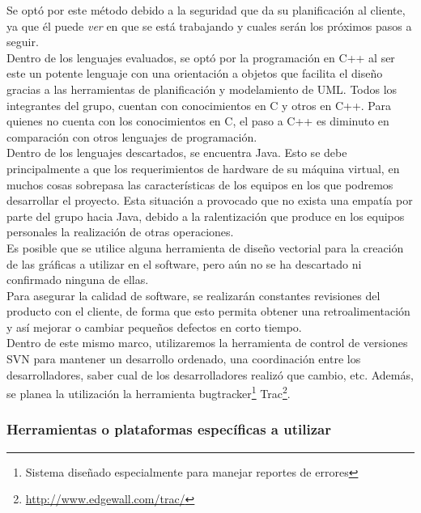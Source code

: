 \documentclass[letterpaper,spanish,10pt]{article}
\begin{document}
Se opt\'o por este m\'etodo debido a la seguridad que da su planificaci\'on al cliente, ya que \'el puede \textit{ver} en que se est\'a trabajando y cuales ser\'an los pr\'oximos pasos a seguir.\\

Dentro de los lenguajes evaluados, se opt\'o por la programaci\'on en C++ al ser este un potente lenguaje con una orientaci\'on a objetos que facilita el dise\~no gracias a las herramientas de planificaci\'on y modelamiento de UML. Todos los integrantes del grupo, cuentan con conocimientos en C y otros en C++. Para quienes no cuenta con los conocimientos en C, el paso a C++ es diminuto en comparaci\'on con otros lenguajes de programaci\'on.\\

Dentro de los lenguajes descartados, se encuentra Java. Esto se debe principalmente a que los requerimientos de hardware de su m\'aquina virtual, en muchos cosas sobrepasa las caracter\'isticas de los equipos en los que podremos desarrollar el proyecto. Esta situaci\'on a provocado que no exista una empat\'ia por parte del grupo hacia Java, debido a la ralentizaci\'on que produce en los equipos personales la realizaci\'on de otras operaciones.\\

Es posible que se utilice alguna herramienta de dise\~no vectorial para la creaci\'on de las gr\'aficas a utilizar en el software, pero a\'un no se ha descartado ni confirmado ninguna de ellas.\\

Para asegurar la calidad de software, se realizar\'an constantes revisiones del producto con el cliente, de forma que esto permita obtener una retroalimentaci\'on y as\'i mejorar o cambiar peque\~nos defectos en corto tiempo.\\

Dentro de este mismo marco, utilizaremos la herramienta de control de versiones SVN para mantener un desarrollo ordenado, una coordinaci\'on entre los desarrolladores, saber cual de los desarrolladores realiz\'o que cambio, etc. 
Adem\'as, se planea la utilizaci\'on la herramienta bugtracker\footnote{Sistema dise\~nado especialmente para manejar reportes de errores} Trac\footnote{\url{http://www.edgewall.com/trac/}}.



\subsubsection{Herramientas o plataformas espec\'ificas a utilizar}
\end{document}
